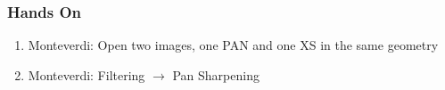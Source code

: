 \documentclass[compress]{beamer}
\begin{document}
\begin{frame}
\begin{columns}
\begin{column}{0.45\textwidth}
\end{column}
\end{columns}

\end{frame}

\begin{frame}
\frametitle{Hands On}
\begin{enumerate}
\item Monteverdi: Open two images, one PAN and one XS in the same geometry
\item Monteverdi: Filtering $\rightarrow$ Pan Sharpening
\end{enumerate}
\end{frame}
\end{document}
